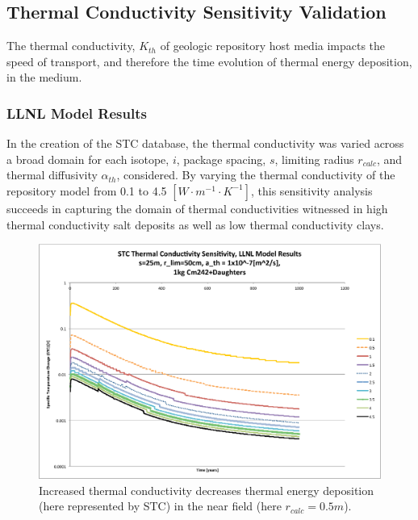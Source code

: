 \subsection{Thermal Conductivity Sensitivity Validation}\label{sec:conductivity}
The thermal conductivity, $K_{th}$ of geologic repository host media impacts 
the speed of transport, and therefore the time evolution of thermal energy 
deposition, in the medium. 

\subsubsection{LLNL Model Results}
In the creation of the \gls{STC} database, the thermal conductivity was varied 
across a broad domain for each isotope, $i$, package spacing, $s$, limiting 
radius $r_{calc}$, and thermal diffusivity $\alpha_{th}$, considered.  By 
varying the thermal conductivity of the repository model from 0.1 to 4.5
$[W\cdot m^{-1} \cdot K^{-1}]$, this sensitivity analysis succeeds in capturing the domain of 
thermal conductivities witnessed in high thermal conductivity salt deposits as 
well as low thermal conductivity clays.

\begin{figure}[htbp!]
\begin{center}
\includegraphics[width=\columnwidth]{./thermal_demonstration/conductivity/Cm242kth_alpha_low.eps}
\end{center}
\caption[$K_{th}$ Sensitivity for Low $\alpha_{th}$ in LLNL Model]{Increased thermal conductivity decreases thermal energy deposition 
(here represented by \gls{STC}) in the near field (here $r_{calc} = 0.5m$).}
\label{fig:Cm242Kth_alpha_low}
\end{figure}


